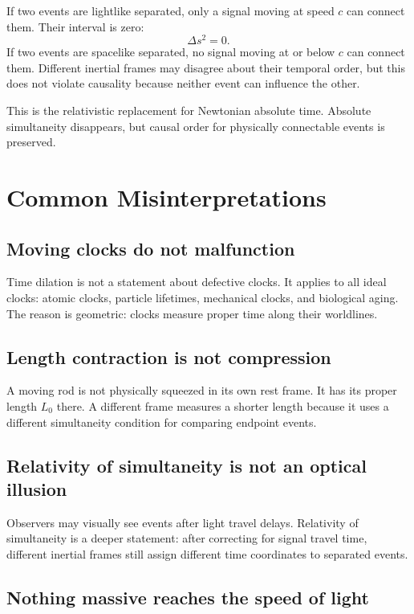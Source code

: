 If two events are lightlike separated, only a signal moving at speed \(c\) can
connect them.  Their interval is zero:
\[
\Delta s^2=0.
\]
If two events are spacelike separated, no signal moving at or below \(c\) can
connect them.  Different inertial frames may disagree about their temporal
order, but this does not violate causality because neither event can influence
the other.

This is the relativistic replacement for Newtonian absolute time.  Absolute
simultaneity disappears, but causal order for physically connectable events is
preserved.

\clearpage

\section{Common Misinterpretations}

\subsection{Moving clocks do not malfunction}

Time dilation is not a statement about defective clocks.  It applies to all
ideal clocks: atomic clocks, particle lifetimes, mechanical clocks, and
biological aging.  The reason is geometric: clocks measure proper time along
their worldlines.

\subsection{Length contraction is not compression}

A moving rod is not physically squeezed in its own rest frame.  It has its
proper length \(L_0\) there.  A different frame measures a shorter length because
it uses a different simultaneity condition for comparing endpoint events.

\subsection{Relativity of simultaneity is not an optical illusion}

Observers may visually see events after light travel delays.  Relativity of
simultaneity is a deeper statement: after correcting for signal travel time,
different inertial frames still assign different time coordinates to separated
events.

\subsection{Nothing massive reaches the speed of light}

